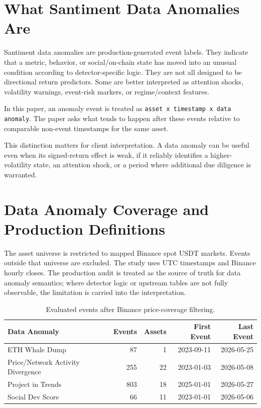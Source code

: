 \documentclass[11pt]{article}
\begin{document}
\section{What Santiment Data Anomalies Are}
Santiment data anomalies are production-generated event labels. They indicate that a metric, behavior, or social/on-chain state has moved into an unusual condition according to detector-specific logic. They are not all designed to be directional return predictors. Some are better interpreted as attention shocks, volatility warnings, event-risk markers, or regime/context features.

In this paper, an anomaly event is treated as \texttt{asset x timestamp x data anomaly}. The paper asks what tends to happen after these events relative to comparable non-event timestamps for the same asset.

This distinction matters for client interpretation. A data anomaly can be useful even when its signed-return effect is weak, if it reliably identifies a higher-volatility state, an attention shock, or a period where additional due diligence is warranted.

\section{Data Anomaly Coverage and Production Definitions}
The asset universe is restricted to mapped Binance spot USDT markets. Events outside that universe are excluded. The study uses UTC timestamps and Binance hourly closes. The production audit is treated as the source of truth for data anomaly semantics; where detector logic or upstream tables are not fully observable, the limitation is carried into the interpretation.

\begin{table}[H]
\centering
\caption{Evaluated events after Binance price-coverage filtering.}
\begin{tabular}{lrrrr}
\toprule
Data Anomaly & Events & Assets & First Event & Last Event \\
\midrule
ETH Whale Dump & 87 & 1 & 2023-09-11 & 2026-05-25 \\
Price/Network Activity Divergence & 255 & 22 & 2023-01-03 & 2026-05-08 \\
Project in Trends & 803 & 18 & 2025-01-01 & 2026-05-27 \\
Social Dev Score & 66 & 11 & 2023-01-01 & 2026-05-06 \\
\bottomrule
\end{tabular}
\end{table}
\end{document}
